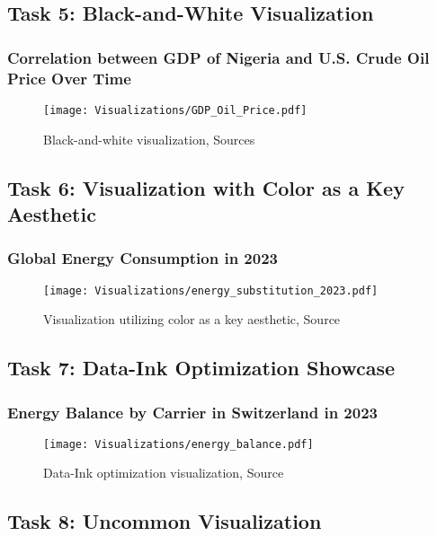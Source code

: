 \documentclass[a4paper,landscape]{article}
\begin{document}
\subsection{Task 5: Black-and-White Visualization}
\subsubsection{Correlation between GDP of Nigeria and U.S. Crude Oil Price Over Time}

\begin{figure}[H]
    \centering
    \texttt{[image: Visualizations/GDP\_Oil\_Price.pdf]} %
    \caption{Black-and-white visualization, Sources \cite{eia2025petroleum} \cite{nigeriaGDP}}
    \label{fig:bw}
\end{figure}

\subsection{Task 6: Visualization with Color as a Key Aesthetic}
\subsubsection{Global Energy Consumption in 2023}

\begin{figure}[H]
    \centering
    \texttt{[image: Visualizations/energy\_substitution\_2023.pdf]}%
    \caption{Visualization utilizing color as a key aesthetic, Source \cite{ourworld2025energy}}
    \label{fig:color}
\end{figure}

\subsection{Task 7: Data-Ink Optimization Showcase}
\subsubsection{Energy Balance by Carrier in Switzerland in 2023}
\begin{figure}[H]
    \centering
    \texttt{[image: Visualizations/energy\_balance.pdf]} %
    \caption{Data-Ink optimization visualization, Source \cite{swiss2025energybalance}}
    \label{fig:swissbalanceenergy}
\end{figure}

\subsection{Task 8: Uncommon Visualization}
\end{document}
